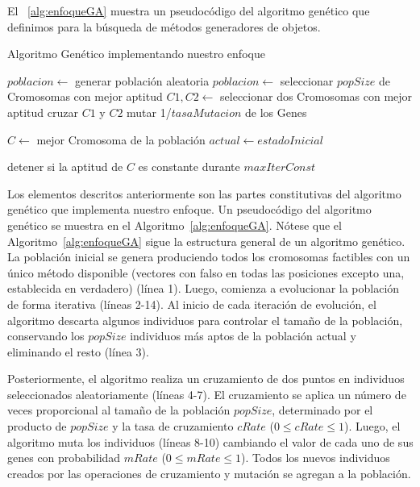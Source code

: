 El ~\ref{alg:enfoqueGA} muestra un pseudocódigo del algoritmo genético que definimos para la búsqueda de métodos generadores de objetos.


\begin{algorithm}
  \caption{Algoritmo Genético implementando nuestro enfoque}
  \label{alg:enfoqueGA}
  \begin{algorithmic}[1]
  
  \STATE $poblacion \gets $ generar población aleatoria
      \STATE $poblacion \leftarrow $ seleccionar $popSize$ de Cromosomas con mejor aptitud
          \STATE $C1, C2 \gets $ seleccionar dos Cromosomas con mejor aptitud
          \STATE cruzar $C1$ y $C2$
      \ENDFOR
          \STATE mutar 1/$tasaMutacion$ de los Genes
      \ENDFOR
  \ENDFOR
  
  \STATE $C \gets$ mejor Cromosoma de la población
  \STATE $actual \gets estadoInicial$

  \STATE detener si la aptitud de $C$ es constante durante $maxIterConst$
  
\end{algorithmic}
\end{algorithm}


Los elementos descritos anteriormente son las partes constitutivas del algoritmo genético que implementa nuestro enfoque. Un pseudocódigo del algoritmo genético se muestra en el Algoritmo~\ref{alg:enfoqueGA}. 
Nótese que el Algoritmo~\ref{alg:enfoqueGA} sigue la estructura general de un algoritmo genético. 
La población inicial se genera produciendo todos los cromosomas factibles con un único método disponible 
(vectores con falso en todas las posiciones excepto una, establecida en verdadero) (línea 1). 
Luego, comienza a evolucionar la población de forma iterativa (líneas 2-14). 
Al inicio de cada iteración de evolución, el algoritmo descarta algunos individuos para controlar el tamaño de la población, 
conservando los $popSize$ individuos más aptos de la población actual y eliminando el resto (línea 3). 

Posteriormente, el algoritmo realiza un cruzamiento de dos puntos en individuos seleccionados aleatoriamente (líneas 4-7). 
El cruzamiento se aplica un número de veces proporcional al tamaño de la población $popSize$, 
determinado por el producto de $popSize$ y la tasa de cruzamiento $cRate$ ($0 \leq cRate \leq 1$). 
Luego, el algoritmo muta los individuos (líneas 8-10) cambiando el valor de cada uno de sus genes con probabilidad $mRate$ ($0 \leq mRate \leq 1$). 
Todos los nuevos individuos creados por las operaciones de cruzamiento y mutación se agregan a la población.

